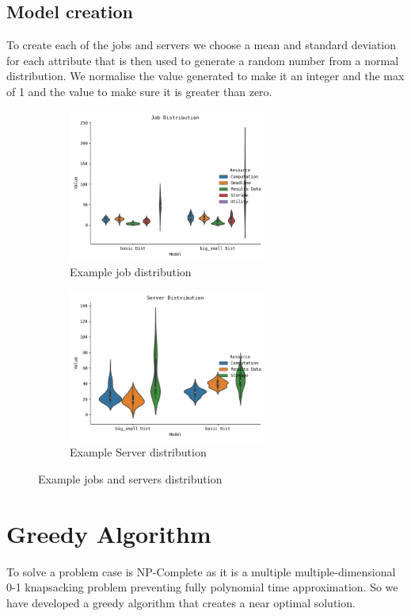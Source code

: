 \documentclass[fleqn]{article}
\begin{document}
\subsection{Model creation}\label{subsec:model-creation}
To create each of the jobs and servers we choose a mean and standard deviation for each attribute that is then used to generate a random number from a normal distribution.
We normalise the value generated to make it an integer and the max of 1 and the value to make sure it is greater than zero.
\begin{figure}[H]
    \begin{subfigure}{0.5\textwidth}
        \includegraphics[width=1\linewidth, height=5cm]{../results/job_distribution.png}
        \caption{Example job distribution}
    \end{subfigure}
    \begin{subfigure}{0.5\textwidth}
        \includegraphics[width=1\linewidth, height=5cm]{../results/server_distribution.png}
        \caption{Example Server distribution}
    \end{subfigure}

    \caption{Example jobs and servers distribution}
\end{figure}

\section{Greedy Algorithm}\label{sec:greedy-algorithm}
To solve a problem case is NP-Complete as it is a multiple multiple-dimensional 0-1 knapsacking problem preventing fully polynomial time approximation.
So we have developed a greedy algorithm that creates a near optimal solution.
\end{document}
